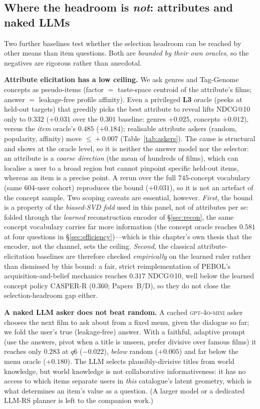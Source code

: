 \documentclass[11pt]{article}
\begin{document}
\subsection{Where the headroom is \emph{not}: attributes and naked LLMs}\label{sec:notheadroom}
Two further baselines test whether the selection headroom can be reached by other means than item questions. Both are
\emph{bounded by their own oracles}, so the negatives are rigorous rather than anecdotal.

\textbf{Attribute elicitation has a low ceiling.} We ask genres and Tag-Genome concepts as pseudo-items (factor $=$
taste-space centroid of the attribute's films; answer $=$ leakage-free profile affinity). Even a privileged \textbf{L3}
oracle (peeks at held-out targets) that greedily picks the best attribute to reveal lifts NDCG@10 only to $0.332$ ($+0.031$ over the $0.301$ baseline:
genres $+0.025$, concepts $+0.012$), versus the \emph{item} oracle's $0.485$ ($+0.184$); realisable attribute askers
(random, popularity, affinity) move $\le\!+0.007$ (Table~\ref{tab:askers}). The cause is structural and shows at the
oracle level, so it is neither the answer model nor the selector: an attribute is a \emph{coarse direction} (the mean
of hundreds of films), which can localise a user to a broad region but cannot pinpoint specific held-out items, whereas
an item is a precise point. A rerun over the full $745$-concept vocabulary (same $604$-user cohort) reproduces the
bound ($+0.031$), so it is not an artefact of the concept sample. Two scoping caveats are essential, however.
\emph{First}, the bound is a property of the \emph{biased-SVD fold} used in this panel, not of attributes per se:
folded through the \emph{learned} reconstruction encoder of \S\ref{sec:recon}, the same concept vocabulary carries far
more information (the concept oracle reaches $0.581$ at four questions in \S\ref{sec:efficiency})---which is this
chapter's own thesis that the encoder, not the channel, sets the ceiling. \emph{Second}, the classical
attribute-elicitation baselines are therefore checked \emph{empirically} on the learned ruler rather than dismissed by
this bound: a fair, strict reimplementation of PEBOL's acquisition-and-belief mechanics reaches $0.317$ NDCG@10, well
below the learned concept policy CASPER-R ($0.360$; Papers~B/D), so they do not close the selection-headroom gap either.

\textbf{A naked LLM asker does not beat random.} A cached \textsc{gpt-4o-mini} asker chooses the next film to ask about
from a fixed menu, given the dialogue so far; we fold the user's true (leakage-free) answer. With a faithful,
adaptive prompt (use the answers, pivot when a title is unseen, prefer divisive over famous films) it reaches only
$0.283$ at $q6$ ($-0.022$), \emph{below} random ($+0.005$) and far below the menu oracle ($+0.180$). The LLM selects
plausibly-divisive titles from world knowledge, but world knowledge is not collaborative informativeness: it has no
access to which items separate users in \emph{this} catalogue's latent geometry, which is what determines an item's
value as a question. (A larger model or a dedicated LLM-RS planner is left to the companion work.)
\end{document}
